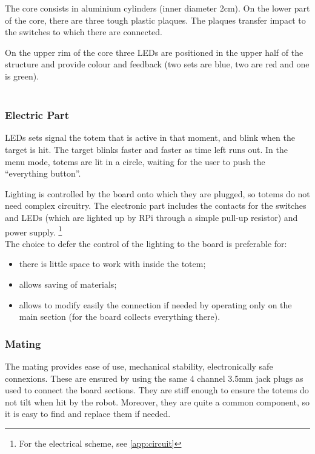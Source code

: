 \documentclass[a4paper,twoside]{book}
\begin{document}
The core consists in aluminium cylinders (inner diameter 2cm). On the lower part of the core, there are three tough plastic plaques. The plaques transfer impact to the switches to which there are connected.

On the upper rim of the core three LEDs are positioned in the upper half of the structure and provide colour and feedback (two sets are blue, two are red and one is green).
\\
\\
\subsubsection{Electric Part}
LEDs sets signal the totem that is active in that moment, and blink when the target is hit. The target blinks faster and faster as time left runs out. In the menu mode, totems are lit in a circle, waiting for the user to push the \textquotedblleft everything button\textquotedblright.

Lighting is controlled by the board onto which they are plugged, so totems do not need complex circuitry. The electronic part includes the contacts for the switches and LEDs (which are lighted up by RPi through a simple pull-up resistor) and power supply.
\footnote{For the electrical scheme, see \autoref{app:circuit}}
\\
The choice to defer the control of the lighting to the board is preferable for:
\begin{itemize}
\item there is little space to work with inside the totem;
\item allows saving of materials;
\item allows to modify easily the connection if needed by operating only on the main section (for the board collects everything there).
\end{itemize}

\subsubsection{Mating}

The mating provides ease of use, mechanical stability, electronically safe connexions. These are ensured by using the same 4 channel 3.5mm jack plugs as used to connect the board sections. They are stiff enough to ensure the totems do not tilt when hit by the robot. Moreover, they are quite a common component, so it is easy to find and replace them if needed.
\end{document}
